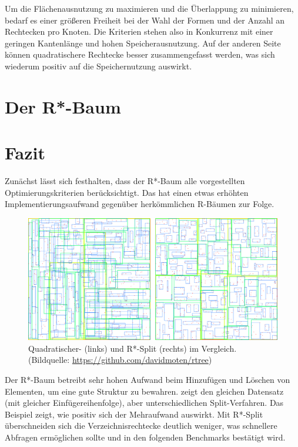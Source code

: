 \documentclass[runningheads,a4paper]{llncs}
\begin{document}
	Um die Flächenausnutzung zu maximieren und die Überlappung zu minimieren, bedarf es einer größeren Freiheit bei der Wahl der Formen und der Anzahl an Rechtecken pro Knoten. Die Kriterien stehen also in Konkurrenz mit einer geringen Kantenlänge und hohen Speicherausnutzung. Auf der anderen Seite können quadratischere Rechtecke besser zusammengefasst werden, was sich wiederum positiv auf die Speichernutzung auswirkt. \citep[vgl.][323-324]{Beckmann:1990}
	


\section{Der R*-Baum} %
\label{sec:rstar_tree}




\section{Fazit} %
\label{sec:fazit}

	Zunächst lässt sich festhalten, dass der R*-Baum alle vorgestellten Optimierungskriterien berücksichtigt. Das hat einen etwas erhöhten Implementierungsaufwand gegenüber herkömmlichen R-Bäumen zur Folge.

	\begin{figure}[H]
		\centering
		\includegraphics[width=1\textwidth]{vergleich-quad-star.png}
		\caption{Quadratischer- (links) und R*-Split (rechts) im Vergleich. (Bildquelle: \url{https://github.com/davidmoten/rtree})}
		\label{fig:vergleich-quad-star}
	\end{figure}

	Der R*-Baum betreibt sehr hohen Aufwand beim Hinzufügen und Löschen von Elementen, um eine gute Struktur zu bewahren.  zeigt den gleichen Datensatz (mit gleicher Einfügereihenfolge), aber unterschiedlichen Split-Verfahren. Das Beispiel zeigt, wie positiv sich der Mehraufwand auswirkt. Mit R*-Split überschneiden sich die Verzeichnisrechtecke deutlich weniger, was schnellere Abfragen ermöglichen sollte und in den folgenden Benchmarks bestätigt wird.
\end{document}
